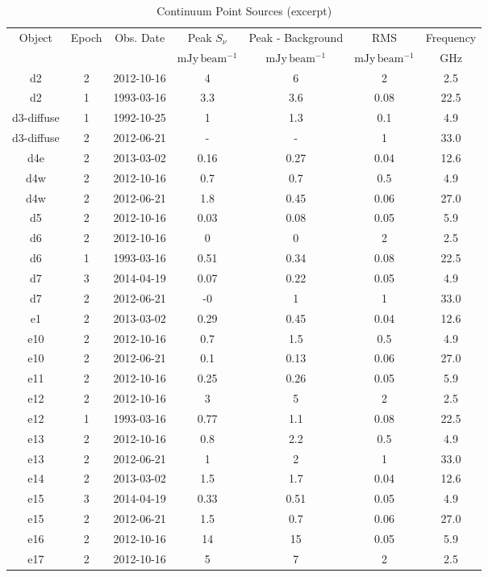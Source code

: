 \begin{table*}[htp]
\caption{Continuum Point Sources (excerpt)}
\begin{tabular}{ccccccc}
\label{tab:contsrcs}
Object & Epoch & Obs. Date & Peak $S_{\nu}$ & Peak - Background & RMS & Frequency \\
 &  &  & $\mathrm{mJy\,beam^{-1}}$ & $\mathrm{mJy\,beam^{-1}}$ & $\mathrm{mJy\,beam^{-1}}$ & $\mathrm{GHz}$ \\
\hline
d2 & 2 & 2012-10-16 & 4 & 6 & 2 & 2.5 \\
d2 & 1 & 1993-03-16 & 3.3 & 3.6 & 0.08 & 22.5 \\
d3-diffuse & 1 & 1992-10-25 & 1 & 1.3 & 0.1 & 4.9 \\
d3-diffuse & 2 & 2012-06-21 & - & - & 1 & 33.0 \\
d4e & 2 & 2013-03-02 & 0.16 & 0.27 & 0.04 & 12.6 \\
d4w & 2 & 2012-10-16 & 0.7 & 0.7 & 0.5 & 4.9 \\
d4w & 2 & 2012-06-21 & 1.8 & 0.45 & 0.06 & 27.0 \\
d5 & 2 & 2012-10-16 & 0.03 & 0.08 & 0.05 & 5.9 \\
d6 & 2 & 2012-10-16 & 0 & 0 & 2 & 2.5 \\
d6 & 1 & 1993-03-16 & 0.51 & 0.34 & 0.08 & 22.5 \\
d7 & 3 & 2014-04-19 & 0.07 & 0.22 & 0.05 & 4.9 \\
d7 & 2 & 2012-06-21 & -0 & 1 & 1 & 33.0 \\
e1 & 2 & 2013-03-02 & 0.29 & 0.45 & 0.04 & 12.6 \\
e10 & 2 & 2012-10-16 & 0.7 & 1.5 & 0.5 & 4.9 \\
e10 & 2 & 2012-06-21 & 0.1 & 0.13 & 0.06 & 27.0 \\
e11 & 2 & 2012-10-16 & 0.25 & 0.26 & 0.05 & 5.9 \\
e12 & 2 & 2012-10-16 & 3 & 5 & 2 & 2.5 \\
e12 & 1 & 1993-03-16 & 0.77 & 1.1 & 0.08 & 22.5 \\
e13 & 2 & 2012-10-16 & 0.8 & 2.2 & 0.5 & 4.9 \\
e13 & 2 & 2012-06-21 & 1 & 2 & 1 & 33.0 \\
e14 & 2 & 2013-03-02 & 1.5 & 1.7 & 0.04 & 12.6 \\
e15 & 3 & 2014-04-19 & 0.33 & 0.51 & 0.05 & 4.9 \\
e15 & 2 & 2012-06-21 & 1.5 & 0.7 & 0.06 & 27.0 \\
e16 & 2 & 2012-10-16 & 14 & 15 & 0.05 & 5.9 \\
e17 & 2 & 2012-10-16 & 5 & 7 & 2 & 2.5 \\

\end{tabular}
\end{table*}
